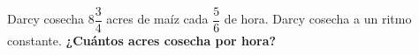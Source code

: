 \question Darcy cosecha $8\dfrac{3}{4}$ acres de maíz cada $\dfrac{5}{6}$ de hora. Darcy cosecha a un ritmo constante.
\textbf{¿Cuántos acres cosecha por hora?}